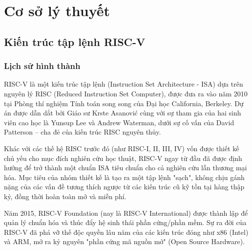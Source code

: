 \chapter{Cơ sở lý thuyết}

\section{Kiến trúc tập lệnh RISC-V}

\subsection{Lịch sử hình thành}

RISC-V là một kiến trúc tập lệnh (Instruction Set Architecture - ISA) 
dựa trên nguyên lý RISC (Reduced Instruction Set Computer), 
được đưa ra vào năm 2010 tại Phòng thí nghiệm Tính toán song song 
của Đại học California, Berkeley. Dự án được dẫn dắt bởi 
Giáo sư Krste Asanović cùng với sự tham gia của hai sinh viên cao học 
là Yunsup Lee và Andrew Waterman, dưới sự cố vấn của David Patterson – cha đẻ 
của kiến trúc RISC nguyên thủy.

Khác với các thế hệ RISC trước đó (như RISC-I, II, III, IV) vốn được 
thiết kế chủ yếu cho mục đích nghiên cứu học thuật, RISC-V ngay từ đầu đã 
được định hướng để trở thành một chuẩn ISA tiêu chuẩn cho cả nghiên cứu lẫn 
thương mại hóa. Mục tiêu của nhóm thiết kế là tạo ra một tập lệnh "sạch", 
không chịu gánh nặng của các vấn đề tương thích ngược từ các kiến trúc cũ kỹ 
tồn tại hàng thập kỷ, đồng thời hoàn toàn mở và miễn phí.

Năm 2015, RISC-V Foundation (nay là RISC-V International) được thành 
lập để quản lý chuẩn hóa và thúc đẩy hệ sinh thái phần cứng/phần mềm. 
Sự ra đời của RISC-V đã phá vỡ thế độc quyền lâu năm của các kiến trúc 
đóng như x86 (Intel) và ARM, mở ra kỷ nguyên "phần cứng mã nguồn mở" 
(Open Source Hardware).

